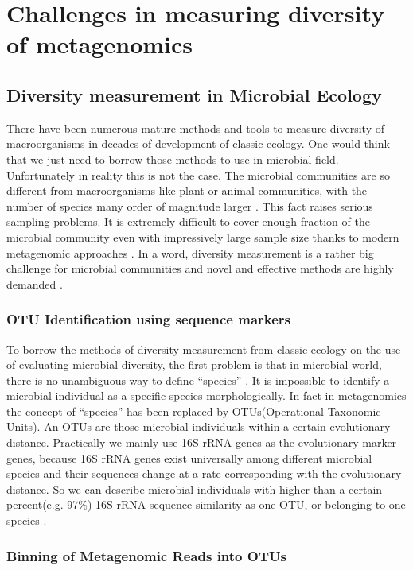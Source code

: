 \section{Challenges in measuring diversity of metagenomics}


\subsection{Diversity measurement in Microbial Ecology}

There have been numerous mature methods and tools to measure diversity of
macroorganisms in decades of development of classic ecology. One would think
that we just need to borrow those methods to use in microbial field.
Unfortunately in reality this is not the case. The microbial communities are so
different from macroorganisms like plant or animal communities, with the number
of species many order of magnitude larger \cite{Whitman:1998aa}. This fact
raises serious sampling problems. It is extremely difficult to cover enough
fraction of the microbial community even with impressively large sample size
thanks to modern metagenomic approaches \cite{Roesch:2007aa}. In a word,
diversity measurement is a rather big challenge for microbial communities and
novel and effective methods are highly demanded \cite{Schloss:2005aa}.

\subsubsection{OTU Identification using sequence markers} To borrow the methods
of diversity measurement from classic ecology on the use of evaluating
microbial diversity, the first problem is that in microbial world, there is no
unambiguous way to define ``species'' \cite{Stackebrandt:2002aa}. It is
impossible to identify a microbial individual as a specific species
morphologically. In fact in metagenomics the concept of ``species'' has been
replaced by OTUs(Operational Taxonomic Units). An OTUs are those microbial
individuals within a certain evolutionary distance. Practically we mainly use
16S rRNA genes as the evolutionary marker genes, because 16S rRNA genes exist
universally among different microbial species and their sequences change at a
rate corresponding with the evolutionary distance. So we can describe microbial
individuals with higher than a certain percent(e.g. 97\%) 16S rRNA sequence
similarity as one OTU, or belonging to one species \cite{Schloss:2005aa}.

\subsubsection{Binning of Metagenomic Reads into OTUs}

